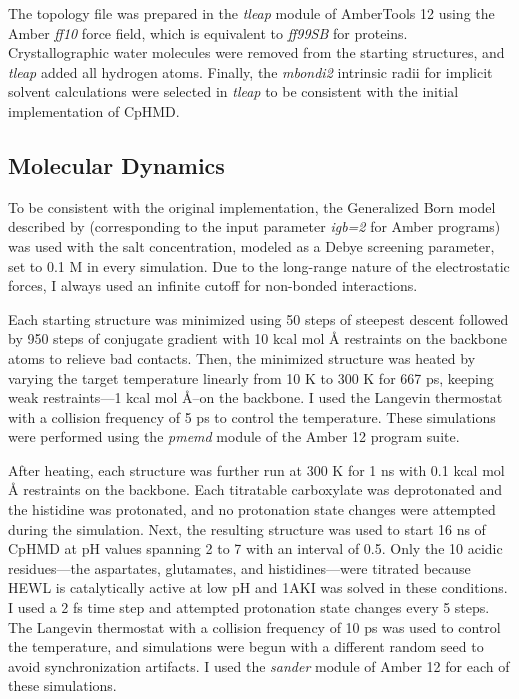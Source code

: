 The topology file was prepared in the \emph{tleap} module of AmberTools 12 using
the Amber \emph{ff10} force field, which is equivalent to \emph{ff99SB}
\cite{Hornak_Proteins_2006_v65_p712} for proteins. Crystallographic water
molecules were removed from the starting structures, and \emph{tleap} added all
hydrogen atoms.  Finally, the \emph{mbondi2} intrinsic radii for implicit
solvent calculations were selected in \emph{tleap} to be consistent with the
initial implementation of CpHMD. \cite{Mongan_JComputChem_2004_v25_p2038}

\subsection{Molecular Dynamics}

To be consistent with the original implementation, the Generalized Born model
described by \citeauthor{Onufriev_Proteins_2004_v55_p383}
\cite{Onufriev_Proteins_2004_v55_p383} (corresponding to the input parameter
\emph{igb=2} for Amber programs) was used with the salt concentration, modeled
as a Debye screening parameter, set to 0.1 M in every simulation.
\cite{Mongan_JComputChem_2004_v25_p2038} Due to the long-range nature of the
electrostatic forces, I always used an infinite cutoff for non-bonded
interactions.

Each starting structure was minimized using 50 steps of steepest descent
followed by 950 steps of conjugate gradient with 10 kcal mol
\AA{} restraints on the backbone atoms to relieve bad contacts. Then,
the minimized structure was heated by varying the target temperature linearly
from 10 K to 300 K for 667 ps, keeping weak restraints---1 kcal mol
\AA{}--on the backbone. I used the Langevin thermostat with a
collision frequency of 5 ps to control the temperature. These
simulations were performed using the \emph{pmemd} module of the Amber 12 program
suite. \cite{AMBER12}

After heating, each structure was further run at 300 K for 1 ns with 0.1 kcal
mol \AA{} restraints on the backbone. Each titratable
carboxylate was deprotonated and the histidine was protonated, and no
protonation state changes were attempted during the simulation. Next, the
resulting structure was used to start 16 ns of CpHMD at pH values spanning 2 to
7 with an interval of 0.5. Only the 10 acidic residues---the aspartates,
glutamates, and histidines---were titrated because HEWL is catalytically active
at low pH \cite{Vocadlo_Nature_2001_v412_p835} and 1AKI was solved in these
conditions. I used a 2 fs time step and attempted protonation state changes
every 5 steps. The Langevin thermostat with a collision frequency of 10
ps was used to control the temperature, and simulations were begun
with a different random seed to avoid synchronization artifacts.
\cite{Sindhikara_JChemTheoryComput_2009_v5_p1624} I used the \emph{sander}
module of Amber 12 for each of these simulations.


